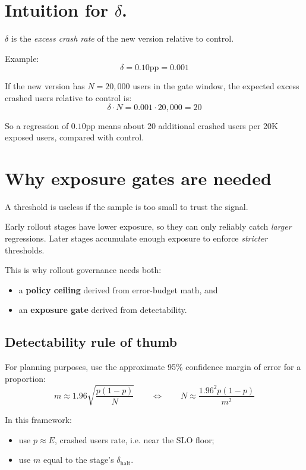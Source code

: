\documentclass{article}
\newcommand{\pp}{\text{pp}}
\newcommand{\dhalt}{\delta_{\text{halt}}}
\begin{document}
\section{Intuition for $\delta$.}

$\delta$ is the \emph{excess crash rate} of the new version relative to control.

Example:
\[
\delta = 0.10\pp = 0.001
\]

If the new version has $N = 20{,}000$ users in the gate window, the expected excess crashed users relative to control is:
\[
\delta \cdot N = 0.001 \cdot 20{,}000 = 20
\]

So a regression of $0.10\pp$ means about 20 additional crashed users per 20K exposed users, compared with control.

\section{Why exposure gates are needed}

A threshold is useless if the sample is too small to trust the signal. 

Early rollout stages have lower exposure, so they can only reliably catch \emph{larger} regressions. 
Later stages accumulate enough exposure to enforce \emph{stricter} thresholds.

This is why rollout governance needs both:
\begin{itemize}[leftmargin=1.4em]
    \item a \textbf{policy ceiling} derived from error-budget math, and
    \item an \textbf{exposure gate} derived from detectability.
\end{itemize}

\subsection{Detectability rule of thumb}

For planning purposes, use the approximate 95\% confidence margin of error for a proportion:
\[
m \approx 1.96 \sqrt{\frac{p(1-p)}{N}}
\qquad \Longleftrightarrow \qquad
N \approx \frac{1.96^2 p(1-p)}{m^2}
\]

In this framework:
\begin{itemize}[leftmargin=1.4em]
    \item use $p \approx E$, crashed users rate, i.e. near the SLO floor;
    \item use $m$ equal to the stage's $\dhalt$.
\end{itemize}
\end{document}
